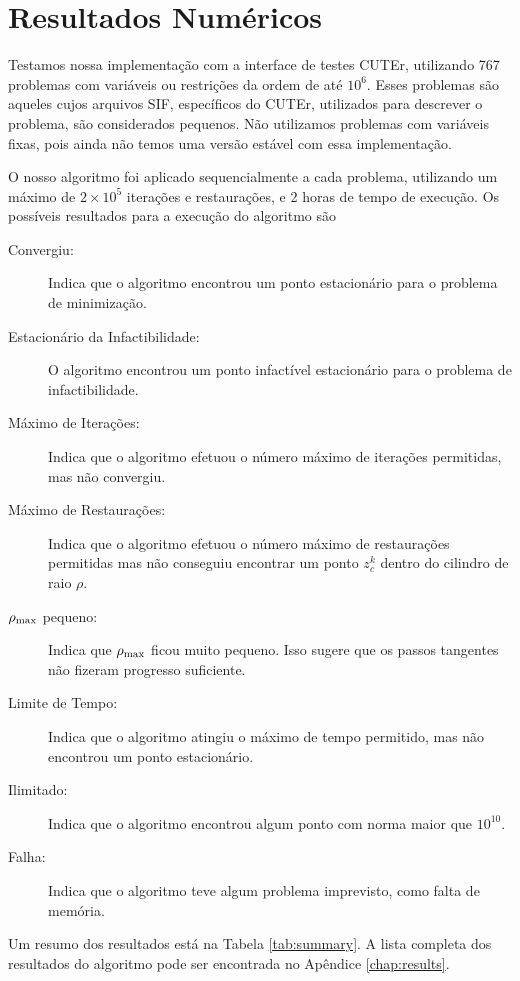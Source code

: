 \chapter{Resultados Numéricos}

Testamos nossa implementação com a interface de testes CUTEr, utilizando 767
problemas com variáveis ou restrições da ordem de até $10^6$.
Esses problemas são aqueles cujos arquivos 
SIF, específicos do CUTEr, utilizados para descrever o
problema, são considerados pequenos.
Não utilizamos problemas com variáveis fixas, pois ainda não
temos uma versão estável com essa implementação.

O nosso algoritmo foi aplicado sequencialmente a cada problema, utilizando um
máximo de $2\times10^5$ iterações e restaurações, e 2 horas de tempo de
execução. 
Os possíveis resultados para a execução do algoritmo são
\begin{description}
  \item[Convergiu:] Indica que o algoritmo encontrou um ponto estacionário para o
    problema de minimização.
  \item[Estacionário da Infactibilidade: ] O algoritmo encontrou um ponto
    infactível estacionário para o problema de infactibilidade.
  \item[Máximo de Iterações:] Indica que o algoritmo efetuou o número máximo de
    iterações permitidas, mas não convergiu.
  \item[Máximo de Restaurações:] Indica que o algoritmo efetuou o número máximo de
    restaurações permitidas mas não conseguiu encontrar um ponto $z_c^k$ dentro
    do cilindro de raio $\rho$.
  \item[$\rho_{\max}$ pequeno:] Indica que $\rho_{\max}$ ficou muito pequeno.
    Isso sugere que os passos tangentes não fizeram progresso suficiente.
  \item[Limite de Tempo:] Indica que o algoritmo atingiu o máximo de tempo
    permitido, mas não encontrou um ponto estacionário.
  \item[Ilimitado:] Indica que o algoritmo encontrou algum ponto com norma maior
    que $10^{10}$.  
  \item[Falha:] Indica que o algoritmo teve algum problema imprevisto, como falta
    de memória.
\end{description}
Um resumo dos resultados está na Tabela \ref{tab:summary}.
A lista completa dos resultados do algoritmo pode ser encontrada no Apêndice
\ref{chap:results}.
